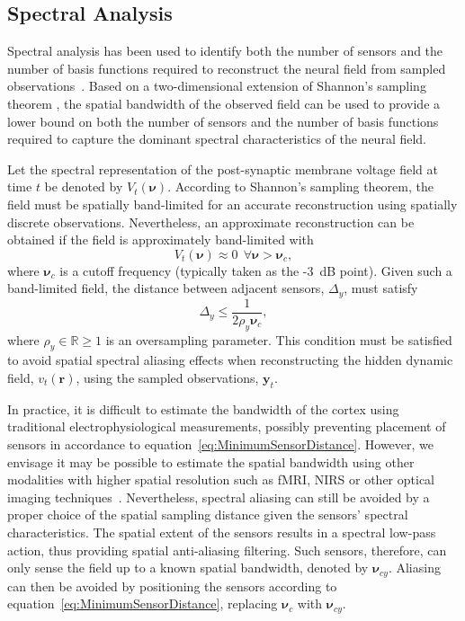 \documentclass[10pt]{article}
\begin{document}
\subsection*{Spectral Analysis}\label{SpectralAnalysisSection} 
Spectral analysis has been used to identify both the number of sensors and the number of basis functions required to reconstruct the neural field from sampled observations~\cite{Sanner1992,Scerri2009}. Based on a two-dimensional extension of Shannon's sampling theorem \cite{Peterson1962}, the spatial bandwidth of the observed field can be used to provide a lower bound on both the number of sensors and the number of basis functions required to capture the dominant spectral characteristics of the neural field.

Let the spectral representation of the post-synaptic membrane voltage field at time $t$ be denoted by $V_t(\boldsymbol{\nu})$. According to Shannon's sampling theorem, the field must be spatially band-limited for an accurate reconstruction using spatially discrete observations. Nevertheless, an approximate reconstruction can be obtained if the field is approximately band-limited with 
\begin{equation}
	V_t(\boldsymbol{\nu}) \approx 0 ~ \ \forall \boldsymbol{\nu} > \boldsymbol{\nu}_c,
\end{equation}
where $\boldsymbol{\nu}_c$ is a cutoff frequency (typically taken as the -3~dB point). Given such a band-limited field, the distance between adjacent sensors, $\Delta_y$, must satisfy 
\begin{equation}
	\label{eq:MinimumSensorDistance} \Delta_y \leq \frac{1}{2\rho_y\boldsymbol{\nu}_{c}}, 
\end{equation}
where $\rho_y \in \mathbb{R} \ge 1$ is an oversampling parameter. This condition must be satisfied to avoid spatial spectral aliasing effects when reconstructing the hidden dynamic field, $v_t(\mathbf{r})$, using the sampled observations, $\mathbf{y}_t$.

In practice, it is difficult to estimate the bandwidth of the cortex using traditional electrophysiological measurements, possibly preventing placement of sensors in accordance to equation~\ref{eq:MinimumSensorDistance}. However, we envisage it may be possible to estimate the spatial bandwidth using other modalities with higher spatial resolution such as fMRI, NIRS or other optical imaging techniques~\cite{Issa2000}. Nevertheless, spectral aliasing can still be avoided by a proper choice of the spatial sampling distance given the sensors' spectral characteristics. The spatial extent of the sensors results in a spectral low-pass action, thus providing spatial anti-aliasing filtering. Such sensors, therefore, can only sense the field up to a known spatial bandwidth, denoted by $\boldsymbol{\nu}_{cy}$. Aliasing can then be avoided by positioning the sensors according to equation~\ref{eq:MinimumSensorDistance}, replacing $\boldsymbol{\nu}_c$ with $\boldsymbol{\nu}_{cy}$.
\end{document}
